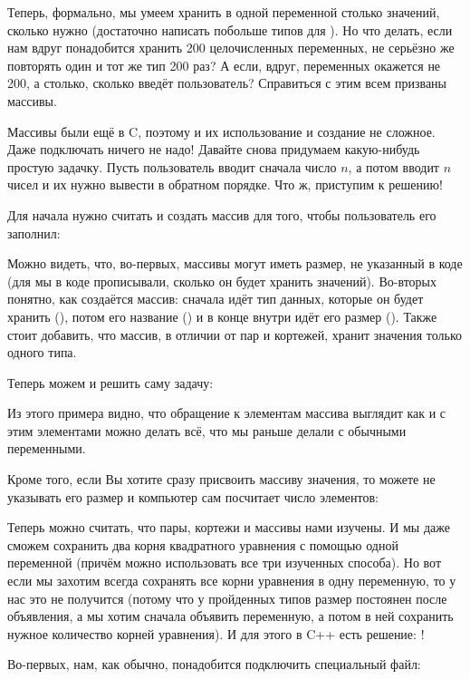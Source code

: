 Теперь, формально, мы умеем хранить в одной переменной столько значений, сколько нужно (достаточно написать побольше типов для ). Но что делать, если нам вдруг понадобится хранить 200 целочисленных переменных, не серьёзно же повторять один и тот же тип  200 раз? А если, вдруг, переменных окажется не 200, а столько, сколько введёт пользователь? Справиться с этим всем призваны массивы.

Массивы были ещё в C, поэтому и их использование и создание не сложное. Даже подключать ничего не надо! Давайте снова придумаем какую-нибудь простую задачку. Пусть пользователь вводит сначала число $n$, а потом вводит $n$ чисел и их нужно вывести в обратном порядке. Что ж, приступим к решению!

Для начала нужно считать  и создать массив для того, чтобы пользователь его заполнил:


Можно видеть, что, во-первых, массивы могут иметь размер, не указанный в коде (для  мы в коде прописывали, сколько он будет хранить значений). Во-вторых понятно, как создаётся массив: сначала идёт тип данных, которые он будет хранить (), потом его название () и в конце внутри \lcpp{[]} идёт его размер (). Также стоит добавить, что массив, в отличии от пар и кортежей, хранит значения только одного типа.

Теперь можем и решить саму задачу:


Из этого примера видно, что обращение к элементам массива выглядит как  и с этим элементами можно делать всё, что мы раньше делали с обычными переменными.

Кроме того, если Вы хотите сразу присвоить массиву значения, то можете не указывать его размер и компьютер сам посчитает число элементов:


Теперь можно считать, что пары, кортежи и массивы нами изучены. И мы даже сможем сохранить два корня квадратного уравнения с помощью одной переменной (причём можно использовать все три изученных способа). Но вот если мы захотим всегда сохранять все корни уравнения в одну переменную, то у нас это не получится (потому что у пройденных типов размер постоянен после объявления, а мы хотим сначала объявить переменную, а потом в ней сохранить нужное количество корней уравнения). И для этого в C++ есть решение: !

Во-первых, нам, как обычно, понадобится подключить специальный файл:

